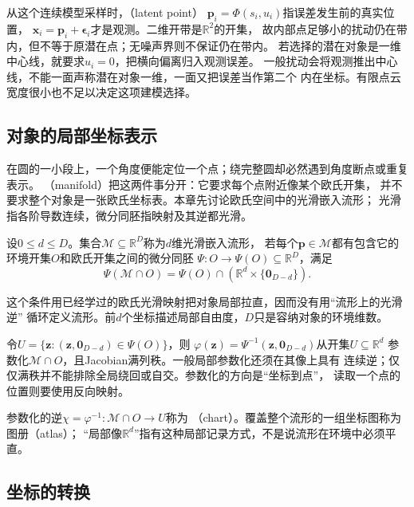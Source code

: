 从这个连续模型采样时，（latent point）
$\bm p_i=\Phi(s_i,u_i)$指误差发生前的真实位置，
$\bm x_i=\bm p_i+\bm\epsilon_i$才是观测。二维开带是$\mathbb R^2$的开集，
故内部点足够小的扰动仍在带内，但不等于原潜在点；无噪声界则不保证仍在带内。
若选择的潜在对象是一维中心线，就要求$u_i=0$，把横向偏离归入观测误差。
一般扰动会将观测推出中心线，不能一面声称潜在对象一维，一面又把误差当作第二个
内在坐标。有限点云宽度很小也不足以决定这项建模选择。

\subsection{对象的局部坐标表示}
\label{sec:geometry-manifold-coordinates}
\label{sec:geometry-local-coordinate-representation}

\label{sec:geometry-local-charts}

在圆的一小段上，一个角度便能定位一个点；绕完整圆却必然遇到角度断点或重复表示。
（manifold）把这两件事分开：它要求每个点附近像某个欧氏开集，
并不要求整个对象是一张欧氏坐标表。本章先讨论欧氏空间中的光滑嵌入流形；
光滑指各阶导数连续，微分同胚指映射及其逆都光滑。

\begin{definition}[光滑嵌入流形]
\label{def:geometry-embedded-manifold}
设$0\leq d\leq D$。集合$\mathcal M\subseteq\mathbb R^D$称为$d$维光滑嵌入流形，
若每个$\bm p\in\mathcal M$都有包含它的环境开集$O$和欧氏开集之间的微分同胚
$\Psi:O\to\Psi(O)\subseteq\mathbb R^D$，满足
\[
 \Psi(\mathcal M\cap O)
 =\Psi(O)\cap(\mathbb R^d\times\{\bm0_{D-d}\}).
\]
\end{definition}
这个条件用已经学过的欧氏光滑映射把对象局部拉直，因而没有用“流形上的光滑逆”
循环定义流形。前$d$个坐标描述局部自由度，$D$只是容纳对象的环境维数。

令$U=\{\bm z:(\bm z,\bm0_{D-d})\in\Psi(O)\}$，则
$\varphi(\bm z)=\Psi^{-1}(\bm z,\bm0_{D-d})$从开集$U\subseteq\mathbb R^d$
参数化$\mathcal M\cap O$，且Jacobian满列秩。一般局部参数化还须在其像上具有
连续逆；仅仅满秩并不能排除全局绕回或自交。参数化的方向是“坐标到点”，
读取一个点的位置则要使用反向映射。


参数化的逆$\chi=\varphi^{-1}:\mathcal M\cap O\to U$称为
（chart）。覆盖整个流形的一组坐标图称为图册（atlas）；
“局部像$\mathbb R^d$”指有这种局部记录方式，不是说流形在环境中必须平直。

\subsection{坐标的转换}
\label{sec:geometry-coordinate-conversions}

